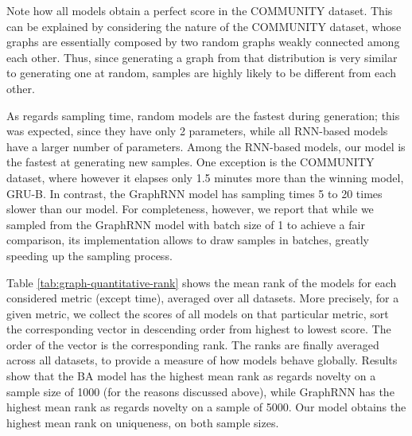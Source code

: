 Note how all models obtain a perfect score in the COMMUNITY dataset. This can be explained by considering the nature of the COMMUNITY dataset, whose graphs are essentially composed by two random graphs weakly connected among each other. Thus, since generating a graph from that distribution is very similar to generating one at random, samples are highly likely to be different from each other.

As regards sampling time, random models are the fastest during generation; this was expected, since they have only 2 parameters, while all RNN-based models have a larger number of parameters. Among the RNN-based models, our model is the fastest at generating new samples. One exception is the COMMUNITY dataset, where however it elapses only 1.5 minutes more than the winning model, GRU-B. In contrast, the GraphRNN model has sampling times 5 to 20 times slower than our model. For completeness, however, we report that while we sampled from the GraphRNN model with batch size of 1 to achieve a fair comparison, its implementation allows to draw samples in batches, greatly speeding up the sampling process.

Table \ref{tab:graph-quantitative-rank} shows the mean rank of the models for each considered metric (except time), averaged over all datasets. More precisely, for a given metric, we collect the scores of all models on that particular metric, sort the corresponding vector in descending order from highest to lowest score. The order of the vector is the corresponding rank. The ranks are finally averaged across all datasets, to provide a measure of how models behave globally. Results show that the BA model has the highest mean rank as regards novelty on a sample size of 1000 (for the reasons discussed above), while GraphRNN has the highest mean rank as regards novelty on a sample of 5000. Our model obtains the highest mean rank on uniqueness, on both sample sizes.


